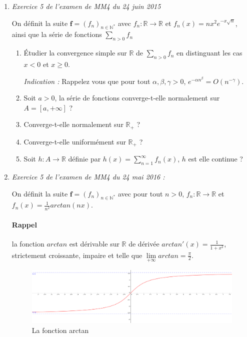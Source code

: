 \documentclass[]{article}
\begin{document}
\begin{enumerate}
\item \textit{Exercice 5 de l'examen de MM4 du 24 juin 2015}

On définit la suite $\textbf{f} = (f_n)_{n \in \mathbb{N}^*}$ avec $f_n : \mathbb{R} \longrightarrow \mathbb{R}$ et $f_n(x)=n x^2 e^{-x \sqrt{n}}$, ainsi que la série de fonctions $\displaystyle \sum_{n > 0}f_n$

\begin{enumerate}
	\item Étudier la convergence simple sur $\mathbb{R}$ de $\displaystyle \sum_{n > 0} f_n$ en distinguant les cas $x < 0$ et $x \geqslant 0$.
	
	\textit{Indication :} Rappelez vous que pour tout $\alpha, \beta, \gamma > 0$, $e^{-\alpha n^\beta}=O(n^{-\gamma})$.
	
	\item Soit $a > 0$, la série de fonctions converge-t-elle normalement sur $A= [a, +\infty]$ ?
	
	\item Converge-t-elle normalement sur $\mathbb{R}_+$ ?
	
	\item Converge-t-elle uniformément sur $\mathbb{R}_+$ ?
	
	\item Soit $h : A \longrightarrow \mathbb{R}$ définie par $\displaystyle h(x)=\sum_{n = 1}^{\infty}f_n(x)$, $h$ est elle continue ?
\end{enumerate}

\newpage
\item \textit{Exercice 5 de l'examen de MM4 du 24 mai 2016 :}

On définit la suite $\textbf{f}=(f_n)_{n \in \mathbb{N}^*}$ avec pour tout $\displaystyle n > 0$, $f_n : \mathbb{R} \longrightarrow \mathbb{R}$ et $f_n(x) = \frac{1}{n^2} arctan(nx)$.

\paragraph{Rappel}
la fonction $arctan$ est dérivable sur $\mathbb{R}$ de dérivée $arctan'(x)=\frac{1}{1+x^2}$, strictement croissante, impaire et telle que $\displaystyle \lim\limits_{+\infty} arctan = \frac{\pi}{2}$.

\begin{figure}[!h]
	\includegraphics[width=350pt]{Images/Arctan}
	\caption{La fonction arctan}
\end{figure}


\end{enumerate}
\end{document}
